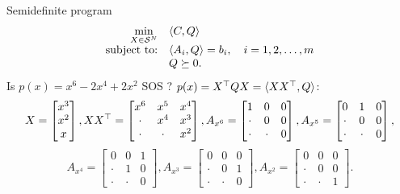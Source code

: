 \begin{frame}{Semidefinite program}
      \begin{equation*}
        \label{eq:sdp_standard}
        \begin{array}{rl}
          \min\limits_{X \in \SymK[N]} & \la C, Q \ra\\
          \text{subject to:} & \la A_i, Q \ra = b_i, \quad i=1,2,\ldots,m\\
          & Q \succeq 0.
        \end{array}
      \end{equation*}
      Is $p(x) = x^6 - 2x^4 + 2x^2$ SOS ? $p(x) = X^\top Q X = \langle X X^\top, Q \rangle$:
      $$
      X =
      \begin{bmatrix}
        x^3\\
        x^2\\
        x
      \end{bmatrix},
      XX^\top =
      \begin{bmatrix}
        x^6 & x^5 & x^4\\
        \cdot & x^4 & x^3\\
        \cdot & \cdot & x^2
      \end{bmatrix},
      A_{x^6} =
      \begin{bmatrix}
        1 & 0 & 0\\
        \cdot & 0 & 0\\
        \cdot & \cdot & 0
      \end{bmatrix},
      A_{x^5} =
      \begin{bmatrix}
        0 & 1 & 0\\
        \cdot & 0 & 0\\
        \cdot & \cdot & 0
      \end{bmatrix},
      $$
      $$
      A_{x^4} =
      \begin{bmatrix}
        0 & 0 & 1\\
        \cdot & 1 & 0\\
        \cdot & \cdot & 0
      \end{bmatrix},
      A_{x^3} =
      \begin{bmatrix}
        0 & 0 & 0\\
        \cdot & 0 & 1\\
        \cdot & \cdot & 0
      \end{bmatrix},
      A_{x^2} =
      \begin{bmatrix}
        0 & 0 & 0\\
        \cdot & 0 & 0\\
        \cdot & \cdot & 1
      \end{bmatrix}.
      $$


\end{frame}
